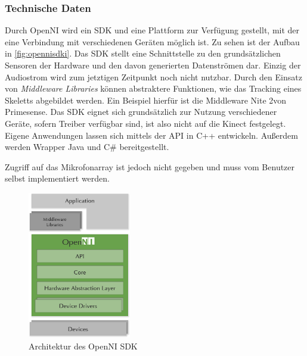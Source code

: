 
\subsubsection{Technische Daten}

Durch OpenNI wird ein SDK und eine Plattform zur Verf\"ugung gestellt, mit der eine Verbindung mit verschiedenen Ger\"aten m\"oglich ist. Zu sehen ist der Aufbau in \ref{fig:opennisdki}.
Das SDK stellt eine Schnittstelle zu den grunds\"atzlichen Sensoren der Hardware und den davon generierten Datenstr\"omen dar.
Einzig der Audiostrom wird zum jetztigen Zeitpunkt noch nicht nutzbar.
Durch den Einsatz von \textit{Middleware Libraries} k\"onnen abstraktere Funktionen, wie das Tracking eines Skeletts abgebildet werden. Ein Beispiel 
hierf\"ur ist die Middleware Nite 2\footnotemark[10] von Primesense. Das SDK eignet sich grunds\"atzlich zur Nutzung verschiedener Ger\"ate, 
sofern Treiber verf\"ugbar sind, ist also nicht auf die Kinect festgelegt.
Eigene Anwendungen lassen sich mittels der API in C++ entwickeln. Außerdem werden Wrapper Java und C\# bereitgestellt.

Zugriff auf das Mikrofonarray ist jedoch nicht gegeben und muss vom Benutzer selbst implementiert werden.

\begin{figure}[htb]
\centering
\includegraphics[width=0.4\textwidth]{img/04kapitel/OpenNI2_Architecture2.png}
\caption[Kinect Explorer]{Architektur des OpenNI SDK\footnotemark[8]}
\label{fig:opennisdk}
\end{figure}

